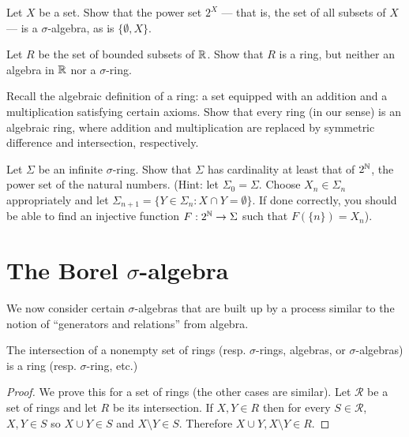 \begin{exercise}
Let $X$ be a set.
Show that the power set $2^{X}$ --- that is, the set of all subsets of $X$ --- is a $\sigma$-algebra, as is $\{\emptyset, X\}$.
\end{exercise}

\begin{exercise}
Let $R$ be the set of bounded subsets of $\mathbb{R}$.
Show that $R$ is a ring, but neither an algebra in $\mathbb{R}$ nor a $\sigma$-ring.
\end{exercise}

\begin{exercise}
Recall the algebraic definition of a ring: a set equipped with an addition and a multiplication satisfying certain axioms.
Show that every ring (in our sense) is an algebraic ring, where addition and multiplication are replaced by symmetric difference and intersection, respectively.
\end{exercise}

\begin{exercise}
Let $\Sigma$ be an infinite $\sigma$-ring. Show that $\Sigma$ has cardinality at least that of $2^{\mathbb{N}}$, the power set of the natural numbers.
(Hint: let $\Sigma_{0} = \Sigma$. Choose $X_{n} \in \Sigma_{n}$ appropriately and let $\Sigma_{n+1} = \{Y \in \Sigma_{n}: X \cap Y = \emptyset\}$. If done correctly, you should be able to find an injective function $F: 2^{\mathbb{N}} \to \Sigma$ such that $F(\{n\}) = X_{n}$).
\end{exercise}

\section{The Borel $\sigma$-algebra}
We now consider certain $\sigma$-algebras that are built up by a process similar to the notion of ``generators and relations'' from algebra.

\begin{lemma}\label{intersection of rings is ring}
The intersection of a nonempty set of rings (resp. $\sigma$-rings, algebras, or $\sigma$-algebras) is a ring (resp. $\sigma$-ring, etc.)
\end{lemma}
\begin{proof}
We prove this for a set of rings (the other cases are similar). Let $\mathcal R$ be a set of rings and let $R$ be its intersection.
If $X, Y \in R$ then for every $S \in \mathcal R$, $X, Y \in S$ so $X \cup Y \in S$ and $X \setminus Y \in S$.
Therefore $X \cup Y, X \setminus Y \in R$.
\end{proof}

